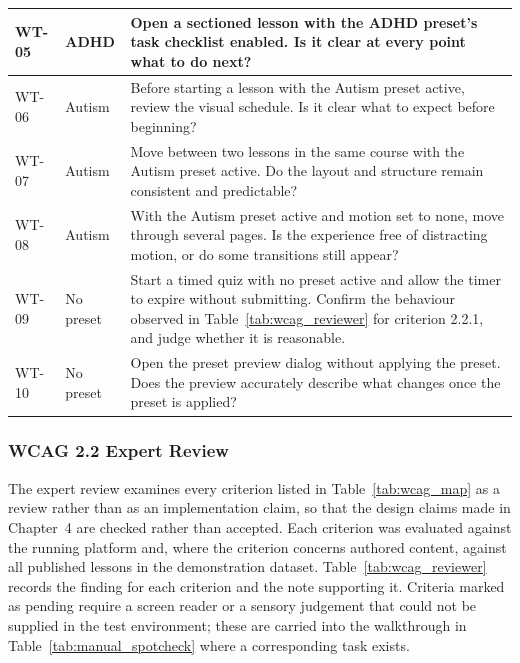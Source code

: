 \documentclass[12pt, oneside]{article} %
\newcommand{\tabbreak}{\hyphenpenalty=200\exhyphenpenalty=200\tolerance=4000\hbadness=10000\hspace{0pt}}
\begin{document}
{\begin{longtable}{|>{\raggedright\arraybackslash\tabbreak}p{1.3cm}|>{\raggedright\arraybackslash\tabbreak}p{2.2cm}|>{\raggedright\arraybackslash\tabbreak}p{10.0cm}|}
WT-05 & ADHD & Open a sectioned lesson with the ADHD preset's task checklist enabled. Is it clear at every point what to do next? \\ \hline
WT-06 & Autism & Before starting a lesson with the Autism preset active, review the visual schedule. Is it clear what to expect before beginning? \\ \hline
WT-07 & Autism & Move between two lessons in the same course with the Autism preset active. Do the layout and structure remain consistent and predictable? \\ \hline
WT-08 & Autism & With the Autism preset active and motion set to none, move through several pages. Is the experience free of distracting motion, or do some transitions still appear? \\ \hline
WT-09 & No preset & Start a timed quiz with no preset active and allow the timer to expire without submitting. Confirm the behaviour observed in Table~\ref{tab:wcag_reviewer} for criterion 2.2.1, and judge whether it is reasonable. \\ \hline
WT-10 & No preset & Open the preset preview dialog without applying the preset. Does the preview accurately describe what changes once the preset is applied? \\ \hline
\end{longtable}
}

\subsubsection{WCAG 2.2 Expert Review}
\label{sec:wcag-review}

The expert review examines every criterion listed in Table~\ref{tab:wcag_map} as a review rather than as an implementation claim, so that the design claims made in Chapter~4 are checked rather than accepted. Each criterion was evaluated against the running platform and, where the criterion concerns authored content, against all published lessons in the demonstration dataset. Table~\ref{tab:wcag_reviewer} records the finding for each criterion and the note supporting it. Criteria marked as pending require a screen reader or a sensory judgement that could not be supplied in the test environment; these are carried into the walkthrough in Table~\ref{tab:manual_spotcheck} where a corresponding task exists.
\end{document}
